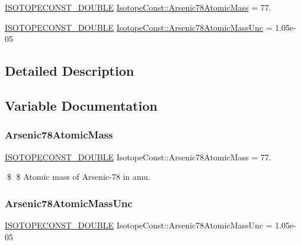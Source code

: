 \begin{DoxyCompactItemize}
\item 
\mbox{\hyperlink{group___isotope_const-_macros_ga8f45a7272ce02c0b4c65c44636ed719a}{I\+S\+O\+T\+O\+P\+E\+C\+O\+N\+S\+T\+\_\+\+D\+O\+U\+B\+LE}} \mbox{\hyperlink{group___isotope_const-_arsenic-_as78_gaf314668702ee814f40e71c9f9012d267}{Isotope\+Const\+::\+Arsenic78\+Atomic\+Mass}} = 77.
\item 
\mbox{\hyperlink{group___isotope_const-_macros_ga8f45a7272ce02c0b4c65c44636ed719a}{I\+S\+O\+T\+O\+P\+E\+C\+O\+N\+S\+T\+\_\+\+D\+O\+U\+B\+LE}} \mbox{\hyperlink{group___isotope_const-_arsenic-_as78_ga6eb4a6fefad52eda3b1025618dbb7f7d}{Isotope\+Const\+::\+Arsenic78\+Atomic\+Mass\+Unc}} = 1.\+05e-\/05
\end{DoxyCompactItemize}


\subsection{Detailed Description}


\subsection{Variable Documentation}
\mbox{\label{group___isotope_const-_arsenic-_as78_gaf314668702ee814f40e71c9f9012d267}} 
\subsubsection{\texorpdfstring{Arsenic78\+Atomic\+Mass}{Arsenic78AtomicMass}}
{\footnotesize\ttfamily \mbox{\hyperlink{group___isotope_const-_macros_ga8f45a7272ce02c0b4c65c44636ed719a}{I\+S\+O\+T\+O\+P\+E\+C\+O\+N\+S\+T\+\_\+\+D\+O\+U\+B\+LE}} Isotope\+Const\+::\+Arsenic78\+Atomic\+Mass = 77.}

\$ \$ Atomic mass of Arsenic-\/78 in amu. \mbox{\label{group___isotope_const-_arsenic-_as78_ga6eb4a6fefad52eda3b1025618dbb7f7d}} 
\subsubsection{\texorpdfstring{Arsenic78\+Atomic\+Mass\+Unc}{Arsenic78AtomicMassUnc}}
{\footnotesize\ttfamily \mbox{\hyperlink{group___isotope_const-_macros_ga8f45a7272ce02c0b4c65c44636ed719a}{I\+S\+O\+T\+O\+P\+E\+C\+O\+N\+S\+T\+\_\+\+D\+O\+U\+B\+LE}} Isotope\+Const\+::\+Arsenic78\+Atomic\+Mass\+Unc = 1.\+05e-\/05}

